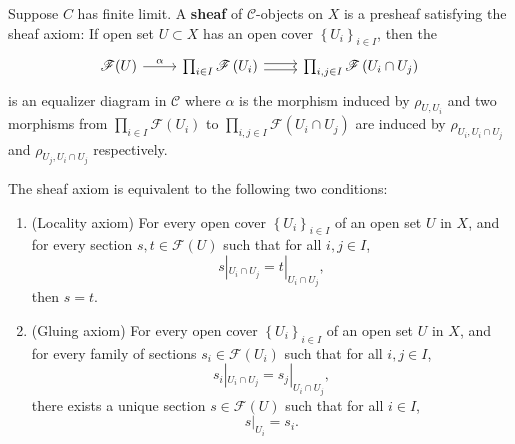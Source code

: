 \documentclass[12pt, oneside]{book}
\begin{document}
\begin{definition}
    Suppose $C$ has finite limit.
    A \textbf{sheaf} of $\mathcal{C}$-objects on $X$ is a presheaf satisfying the sheaf axiom:
    If open set $U\subset X$ has an open cover $\left\{U_i\right\}_{i \in I}$, then the
    \begin{equation*}
        \begin{tikzcd}
            \mathscr{F}(U) \arrow[r,"\alpha"] & \prod_{i \in I} \mathscr{F}\left(U_i\right) \arrow[r,shift left=0.5ex] \arrow[r,shift right=0.5ex] & \prod_{i,j \in I} \mathscr{F}\left(U_i \cap U_j\right)
        \end{tikzcd}
    \end{equation*}
    is an equalizer diagram in $\mathcal{C}$ where $\alpha$ is the morphism induced by $\rho_{U, U_i}$ and two morphisms from $\prod_{i \in I} \mathscr{F}\left(U_i\right)$ to $\prod_{i,j \in I} \mathscr{F}\left(U_i \cap U_j\right)$ are induced by $\rho_{U_i, U_i \cap U_j}$ and $\rho_{U_j, U_i \cap U_j}$ respectively.

    \begin{remark}
        The sheaf axiom is equivalent to the following two conditions:
        \begin{enumerate}[label=(\roman*)]
            \item (Locality axiom)
                  For every open cover $\left\{U_i\right\}_{i \in I}$ of an open set $U$ in $X$, and for every section $s,t \in \mathscr{F}(U)$ such that for all $i,j \in I$,
                  \begin{equation*}
                      s|_{U_i \cap U_j}=t|_{U_i \cap U_j} ,
                  \end{equation*}
                  then $s=t$.
            \item (Gluing axiom)
                  For every open cover $\left\{U_i\right\}_{i \in I}$ of an open set $U$ in $X$, and for every family of sections $s_i \in \mathscr{F}\left(U_i\right)$ such that for all $i,j \in I$,
                  \begin{equation*}
                      s_i|_{U_i \cap U_j}=s_j|_{U_i \cap U_j} ,
                  \end{equation*}
                  there exists a unique section $s \in \mathscr{F}(U)$ such that for all $i \in I$,
                  \begin{equation*}
                      s|_{U_i}=s_i .
                  \end{equation*}
        \end{enumerate}
    \end{remark}
\end{definition}
\end{document}
